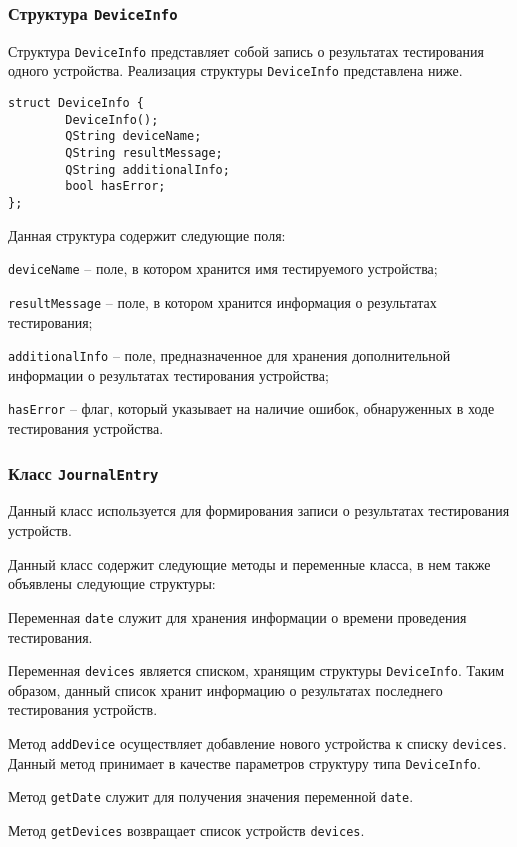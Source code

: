 \subsubsection{Структура \texttt{DeviceInfo}}
Структура \texttt{DeviceInfo} представляет собой запись о результатах тестирования одного устройства.
Реализация структуры \texttt{DeviceInfo} представлена ниже.
\medskip
\begin{verbatim}
struct DeviceInfo {
        DeviceInfo();
        QString deviceName;
        QString resultMessage;
        QString additionalInfo;
        bool hasError;
};
\end{verbatim}
\medskip


Данная структура содержит следующие поля:
\begin{enum}
	\item \texttt{deviceName} -- поле, в котором хранится имя тестируемого устройства;
	\item \texttt{resultMessage} -- поле, в котором хранится информация о результатах тестирования;
	\item \texttt{additionalInfo} -- поле, предназначенное для хранения дополнительной информации о
		результатах тестирования устройства;
	\item \texttt{hasError} -- флаг, который указывает на наличие ошибок, обнаруженных в ходе
		тестирования устройства.
\end{enum}

\subsubsection{Класс \texttt{JournalEntry}}
Данный класс используется для формирования записи о результатах тестирования устройств.

Данный класс содержит следующие методы и переменные класса, в нем также объявлены следующие структуры:
\begin{enum}
	\item Переменная \texttt{date} служит для хранения информации о времени проведения тестирования.

	\item Переменная \texttt{devices} является списком, хранящим структуры \texttt{DeviceInfo}. Таким образом,
		данный список хранит информацию о результатах последнего тестирования устройств.

	\item Метод \texttt{addDevice} осуществляет добавление нового устройства к списку \texttt{devices}. Данный метод
		принимает в качестве параметров структуру типа \texttt{DeviceInfo}.

	\item Метод \texttt{getDate} служит для получения значения переменной \texttt{date}.

	\item Метод \texttt{getDevices} возвращает список устройств \texttt{devices}.
\end{enum}

